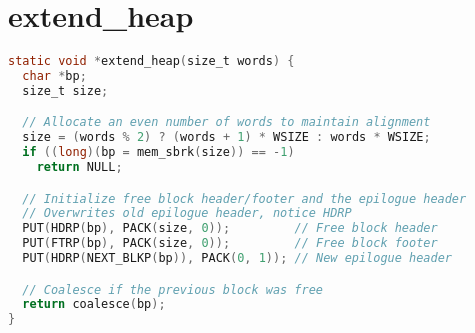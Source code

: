 \documentclass[11pt]{report}
\begin{document}
\section{extend\_heap}\label{appendix:malloc_lab_code_extend_heap}
\begin{lstlisting}[language=C]
static void *extend_heap(size_t words) {
  char *bp;
  size_t size;

  // Allocate an even number of words to maintain alignment 
  size = (words % 2) ? (words + 1) * WSIZE : words * WSIZE;
  if ((long)(bp = mem_sbrk(size)) == -1)
    return NULL;

  // Initialize free block header/footer and the epilogue header 
  // Overwrites old epilogue header, notice HDRP
  PUT(HDRP(bp), PACK(size, 0));         // Free block header 
  PUT(FTRP(bp), PACK(size, 0));         // Free block footer 
  PUT(HDRP(NEXT_BLKP(bp)), PACK(0, 1)); // New epilogue header 

  // Coalesce if the previous block was free 
  return coalesce(bp);
}
\end{lstlisting}
\end{document}
